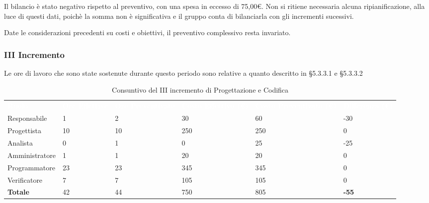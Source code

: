 Il bilancio è stato negativo rispetto al preventivo, con una spesa in eccesso di 75,00\euro. Non si ritiene necessaria alcuna ripianificazione, alla luce di questi dati, poichè la somma non è significativa e il gruppo conta di bilanciarla con gli incrementi sucessivi.

Date le considerazioni precedenti su costi e obiettivi, il preventivo complessivo resta invariato.

\pagebreak


\subsubsection{III Incremento}
Le ore di lavoro che sono state sostenute durante questo periodo sono relative a quanto descritto in §5.3.3.1 e §5.3.3.2

\begin{table}[H]
\begin{center}
\renewcommand{\arraystretch}{1.5}
\begin{tabular}{ m{}<{\centering}  m{}<{\centering} m{}<{\centering} m{}<{\centering} m{}<{\centering} m{}<{\centering}}
	\rowcolor{darkblue}
	\textcolor{white}{\textbf{Ruolo}} & \textcolor{white}{\textbf{Ore Effettive}} & \textcolor{white}{\textbf{Ore Preventivate}}&\textcolor{white}{\textbf{Costo Effettivo (\euro)}}&\textcolor{white}{\textbf{Costo Preventivato (\euro)}}&\textcolor{white}{\textbf{Differenza (\euro)}}\\ 

	Responsabile & 1 & 2 & 30 & 60 & -30 \\	
	
	Progettista & 10 & 10 & 250 & 250 & 0\\
	
	Analista & 0 & 1 & 0 & 25 & -25\\
	
	Amministratore & 1 & 1 & 20 & 20 & 0\\
	
	Programmatore & 23 & 23 & 345 & 345 & 0\\
	
	Verificatore & 7 & 7 & 105 & 105 & 0\\
	
	\textbf{Totale} & 42 & 44 & 750 & 805 & \textbf{-55} \\
	
\end{tabular}
\caption{Consuntivo del III incremento di Progettazione e Codifica}
\end{center}
\end{table}

